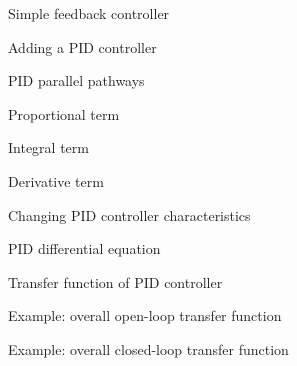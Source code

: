 \documentclass[compress]{beamer}
\begin{document}
{
    \begin{frame}{Simple feedback controller}
    \end{frame}
}

{
    \begin{frame}{Adding a PID controller}
    \end{frame}
}

{
    \begin{frame}{PID parallel pathways}
    \end{frame}
}

{
    \begin{frame}{Proportional term}
    \end{frame}
}

{
    \begin{frame}{Integral term}
    \end{frame}
}

{
    \begin{frame}{Derivative term}
    \end{frame}
}

{
    \begin{frame}{Changing PID controller characteristics}
    \end{frame}
}

{
    \begin{frame}{PID differential equation}
    \end{frame}
}

{
    \begin{frame}{Transfer function of PID controller}
    \end{frame}
}

{
    \begin{frame}{Example: overall open-loop transfer function}
    \end{frame}
}

{
    \begin{frame}{Example: overall closed-loop transfer function}
    \end{frame}
}
\end{document}

